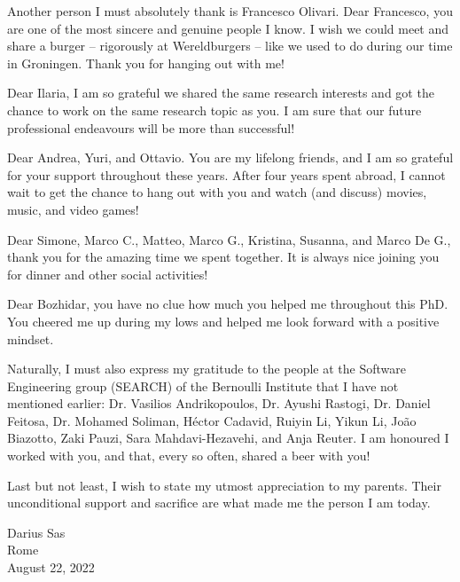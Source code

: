 Another person I must absolutely thank is Francesco Olivari. Dear Francesco, you are one of the most sincere and genuine people I know.  
I wish we could meet and share a burger -- rigorously at Wereldburgers -- like we used to do during our time in Groningen.
Thank you for hanging out with me! 

Dear Ilaria, I am so grateful we shared the same research interests and got the chance to work on the same research topic as you. I am sure that our future professional endeavours will be more than successful!

Dear Andrea, Yuri, and Ottavio. You are my lifelong friends, and I am so grateful for your support throughout these years. 
After four years spent abroad, I cannot wait to get the chance to hang out with you and watch (and discuss) movies, music, and video games!

Dear Simone, Marco C., Matteo, Marco G., Kristina, Susanna, and Marco De G., thank you for the amazing time we spent together. It is always nice joining you for dinner and other social activities!

Dear Bozhidar, you have no clue how much you helped me throughout this PhD. You cheered me up during my lows and helped me look forward with a positive mindset.

Naturally, I must also express my gratitude to the people at the Software Engineering group (SEARCH) of the Bernoulli Institute that I have not mentioned earlier: Dr. Vasilios Andrikopoulos,  Dr. Ayushi Rastogi, Dr. Daniel Feitosa,  Dr. Mohamed Soliman, H\'ector Cadavid, Ruiyin Li, Yikun Li, João Biazotto, Zaki Pauzi, Sara Mahdavi-Hezavehi, and Anja Reuter. 
I am honoured I worked with you, and that, every so often, shared a beer with you!

Last but not least, I wish to state my utmost appreciation to my parents.
Their unconditional support and sacrifice are what made me the person I am today.


\begin{flushright}
    Darius Sas\\
    Rome\\
    August 22, 2022
\end{flushright}
